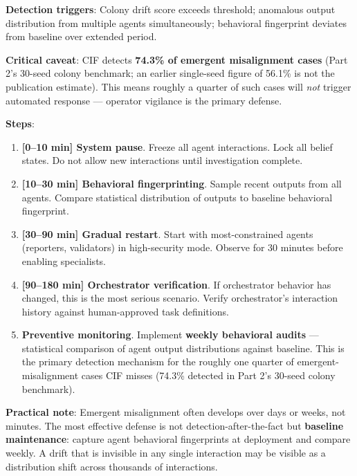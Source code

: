 \documentclass[
]{article}
\providecommand{\tightlist}{%
  \setlength{\itemsep}{0pt}\setlength{\parskip}{0pt}}
\begin{document}
\textbf{Detection triggers}: Colony drift score exceeds threshold;
anomalous output distribution from multiple agents simultaneously;
behavioral fingerprint deviates from baseline over extended period.

\textbf{Critical caveat}: CIF detects \textbf{74.3\% of emergent
misalignment cases} (Part 2's 30-seed colony benchmark; an earlier
single-seed figure of 56.1\% is not the publication estimate). This
means roughly a quarter of such cases will \emph{not} trigger automated
response --- operator vigilance is the primary defense.

\textbf{Steps}:

\begin{enumerate}
\def\labelenumi{\arabic{enumi}.}
\tightlist
\item
  \textbf{{[}0--10 min{]} System pause}. Freeze all agent interactions.
  Lock all belief states. Do not allow new interactions until
  investigation complete.
\item
  \textbf{{[}10--30 min{]} Behavioral fingerprinting}. Sample recent
  outputs from all agents. Compare statistical distribution of outputs
  to baseline behavioral fingerprint.
\item
  \textbf{{[}30--90 min{]} Gradual restart}. Start with most-constrained
  agents (reporters, validators) in high-security mode. Observe for 30
  minutes before enabling specialists.
\item
  \textbf{{[}90--180 min{]} Orchestrator verification}. If orchestrator
  behavior has changed, this is the most serious scenario. Verify
  orchestrator's interaction history against human-approved task
  definitions.
\item
  \textbf{Preventive monitoring}. Implement \textbf{weekly behavioral
  audits} --- statistical comparison of agent output distributions
  against baseline. This is the primary detection mechanism for the
  roughly one quarter of emergent-misalignment cases CIF misses (74.3\%
  detected in Part 2's 30-seed colony benchmark).
\end{enumerate}

\textbf{Practical note}: Emergent misalignment often develops over days
or weeks, not minutes. The most effective defense is not
detection-after-the-fact but \textbf{baseline maintenance}: capture
agent behavioral fingerprints at deployment and compare weekly. A drift
that is invisible in any single interaction may be visible as a
distribution shift across thousands of interactions.

\newpage
\end{document}

